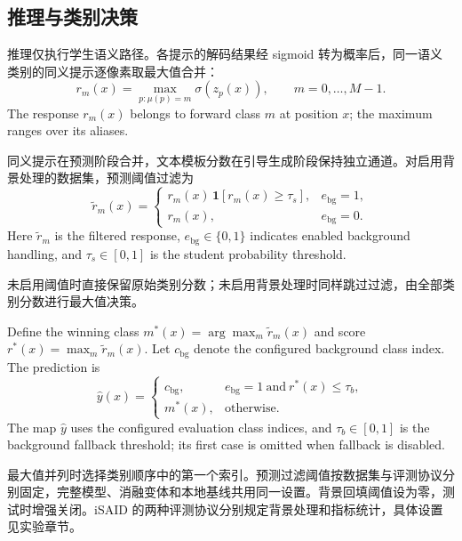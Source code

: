 \subsection{推理与类别决策}
推理仅执行学生语义路径。各提示的解码结果经 sigmoid 转为概率后，同一语义类别的同义提示逐像素取最大值合并：
\begin{equation}
 r_m(x)=\max_{p:\mu(p)=m}\sigma(z_p(x)),
 \qquad m=0,\ldots,M-1.
 \label{eq:alias_merge}
\end{equation}
The response $r_m(x)$ belongs to forward class $m$ at position $x$; the maximum ranges over its aliases.

同义提示在预测阶段合并，文本模板分数在引导生成阶段保持独立通道。对启用背景处理的数据集，预测阈值过滤为
\begin{equation}
 \widetilde r_m(x)=
 \begin{cases}
 r_m(x)\,\mathbf 1[r_m(x)\ge\tau_s], & e_{\mathrm{bg}}=1,\\
 r_m(x), & e_{\mathrm{bg}}=0.
 \end{cases}
 \label{eq:student_filter}
\end{equation}
Here $\widetilde r_m$ is the filtered response, $e_{\mathrm{bg}}\in\{0,1\}$ indicates enabled background handling, and $\tau_s\in[0,1]$ is the student probability threshold.

未启用阈值时直接保留原始类别分数；未启用背景处理时同样跳过过滤，由全部类别分数进行最大值决策。

Define the winning class $m^*(x)=\arg\max_m\widetilde r_m(x)$ and score $r^*(x)=\max_m\widetilde r_m(x)$. Let $c_{\mathrm{bg}}$ denote the configured background class index. The prediction is
\begin{equation}
 \widehat y(x)=
 \begin{cases}
 c_{\mathrm{bg}}, & e_{\mathrm{bg}}=1\ \text{and}\ r^*(x)\le\tau_b,\\
 m^*(x), & \text{otherwise}.
 \end{cases}
 \label{eq:label_restore}
\end{equation}
The map $\widehat y$ uses the configured evaluation class indices, and $\tau_b\in[0,1]$ is the background fallback threshold; its first case is omitted when fallback is disabled.

最大值并列时选择类别顺序中的第一个索引。预测过滤阈值按数据集与评测协议分别固定，完整模型、消融变体和本地基线共用同一设置。背景回填阈值设为零，测试时增强关闭。iSAID 的两种评测协议分别规定背景处理和指标统计，具体设置见实验章节。
